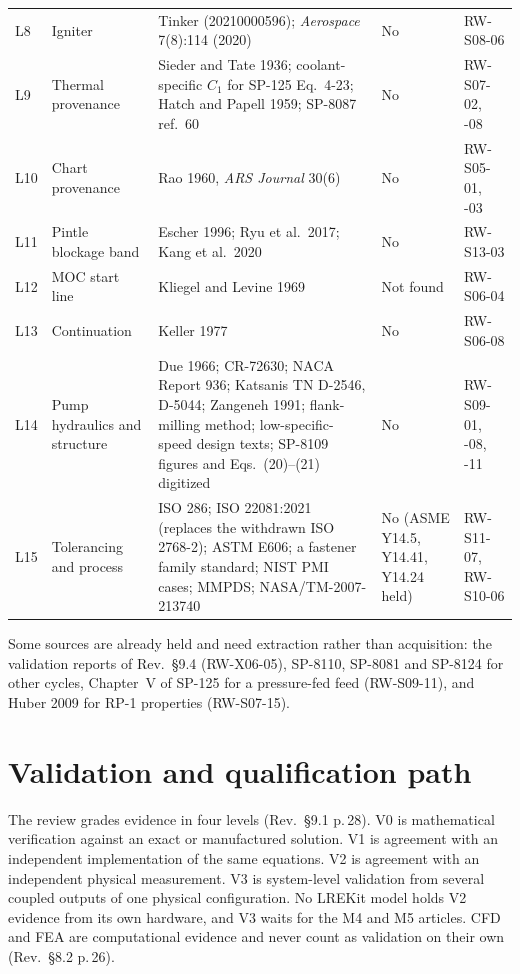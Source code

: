 {\begin{longtable}{@{}P{0.65cm}P{2.6cm}P{8.0cm}P{1.35cm}P{3.0cm}@{}}
L8 & Igniter & Tinker (20210000596); \emph{Aerospace} 7(8):114 (2020) & No & RW-S08-06 \\
L9 & Thermal provenance & Sieder and Tate 1936; coolant-specific $C_1$ for SP-125 Eq.\ 4-23; Hatch and Papell 1959; SP-8087 ref.\ 60 & No & RW-S07-02, -08 \\
L10 & Chart provenance & Rao 1960, \emph{ARS Journal} 30(6) & No & RW-S05-01, -03 \\
L11 & Pintle blockage band & Escher 1996; Ryu et al.\ 2017; Kang et al.\ 2020 & No & RW-S13-03 \\
L12 & MOC start line & Kliegel and Levine 1969 & Not found & RW-S06-04 \\
L13 & Continuation & Keller 1977 & No & RW-S06-08 \\
L14 & Pump hydraulics and structure & Due 1966; CR-72630; NACA Report 936; Katsanis TN D-2546, D-5044; Zangeneh 1991; flank-milling method; low-specific-speed design texts; SP-8109 figures and Eqs.\ (20)--(21) digitized & No & RW-S09-01, -08, -11 \\
L15 & Tolerancing and process & ISO 286; ISO 22081:2021 (replaces the withdrawn ISO 2768-2); ASTM E606; a fastener family standard; NIST PMI cases; MMPDS; NASA/TM-2007-213740 & No (ASME Y14.5, Y14.41, Y14.24 held) & RW-S11-07, RW-S10-06 \\
\bottomrule
\end{longtable}
}

Some sources are already held and need extraction rather than acquisition: the validation reports of Rev.\ \S9.4 (RW-X06-05), SP-8110, SP-8081 and SP-8124 for other cycles, Chapter~V of SP-125 for a pressure-fed feed (RW-S09-11), and Huber 2009 for RP-1 properties (RW-S07-15).

\section{Validation and qualification path}\label{sec:rw-validation}

The review grades evidence in four levels (Rev.\ \S9.1 p.\,28). V0 is mathematical verification against an exact or manufactured solution. V1 is agreement with an independent implementation of the same equations. V2 is agreement with an independent physical measurement. V3 is system-level validation from several coupled outputs of one physical configuration. No LREKit model holds V2 evidence from its own hardware, and V3 waits for the M4 and M5 articles. CFD and FEA are computational evidence and never count as validation on their own (Rev.\ \S8.2 p.\,26).


